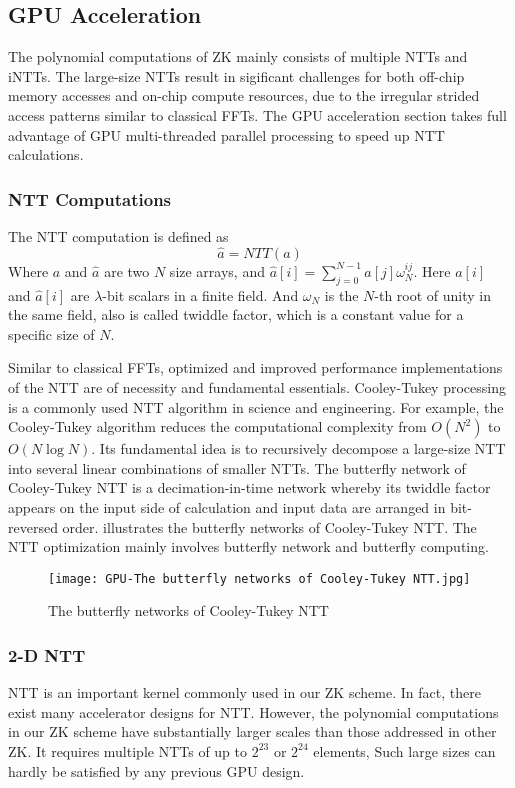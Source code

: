 \subsection{GPU Acceleration}\label{section: gpu-acceleration}
The polynomial computations of ZK mainly consists of multiple NTTs and iNTTs. The large-size NTTs result in sigificant challenges for both off-chip memory accesses and on-chip compute resources, due to the irregular strided access patterns similar to classical FFTs. The GPU acceleration section takes full advantage of GPU multi-threaded parallel processing to speed up NTT calculations.
\subsubsection{NTT Computations}
The NTT computation is defined as
\[\hat{a} = NTT{(a)}\]
Where $a$ and  $\hat{a}$ are two $N$ size arrays, and  $\hat{a}[i] = \sum_{j=0}^{N-1} a[j] \omega_N^{ij}$. Here $a[i]$ and $\hat{a}[i]$ are $\lambda$-bit scalars in a finite field. And $\omega_N$ is the $N$-th root of unity in the same field, also is called twiddle factor, which is a constant value for a specific size of $N$.

Similar to classical FFTs, optimized and improved performance implementations of the NTT are of necessity and fundamental essentials. Cooley-Tukey processing is a commonly used NTT algorithm in science and engineering. For example, the Cooley-Tukey algorithm reduces the computational complexity from $O(N^2)$ to $O(N\log N)$. Its fundamental idea is to recursively decompose a large-size NTT into several linear combinations of smaller NTTs. The butterfly network of Cooley-Tukey NTT is a decimation-in-time network whereby its twiddle factor appears on the input side of calculation and input data are arranged in bit-reversed order.  illustrates the butterfly networks of Cooley-Tukey NTT. The NTT optimization mainly involves butterfly network and butterfly computing.
\begin{figure}[!ht]
    \centering
    \texttt{[image: GPU-The butterfly networks of Cooley-Tukey NTT.jpg]}
    \caption{The butterfly networks of Cooley-Tukey NTT}
    \label{fig:The Butterfly Networks of Cooley-Tukey NTT}
\end{figure}
\subsubsection{2-D NTT}
NTT is an important kernel commonly used in our ZK scheme. In fact, there exist many accelerator designs for NTT. However, the polynomial computations in our ZK scheme have substantially larger scales than those addressed in other ZK. It requires multiple NTTs of up to $2^{23}$ or $2^{24}$ elements, Such large sizes can hardly be satisfied by any previous GPU design.

